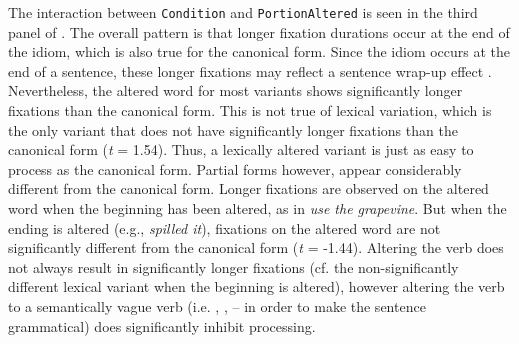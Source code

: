 \documentclass[output=paper
,modfonts
,nonflat]{langsci/langscibook}
\begin{document}
The interaction between \texttt{Condition} and \texttt{PortionAltered} is seen in the third panel of . The overall pattern is that longer fixation durations occur at the end of the idiom, which is also true for the canonical form. Since the idiom occurs at the end of a sentence, these longer fixations may reflect a sentence wrap-up effect \citep{RaynerEtAl2000, HirotaniEtAl2006}. Nevertheless, the altered word for most variants shows significantly longer fixations than the canonical form. This is not true of lexical variation, which is the only variant that does not have significantly longer fixations than the canonical form (\textit{t} = 1.54). Thus, a lexically altered variant is just as easy to process as the canonical form. Partial forms however, appear considerably different from the canonical form. Longer fixations are observed on the altered word when the beginning has been altered, as in \textit{use the grapevine}. But when the ending is altered (e.g., \textit{spilled it}), fixations on the altered word are not significantly different from the canonical form (\textit{t} = -1.44). 
Altering the verb does not always result in significantly longer fixations (cf. the non-significantly different lexical variant when the beginning is altered),
however altering the verb to a semantically vague verb (i.e. , ,  – in order to make the sentence grammatical) does significantly inhibit processing.
\end{document}
